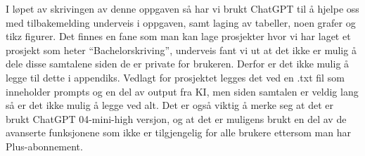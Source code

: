 \documentclass[
  12pt,
  a4paper,
  DIV=11,
  numbers=noendperiod]{scrartcl}
\begin{document}
I løpet av skrivingen av denne oppgaven så har vi brukt ChatGPT til å
hjelpe oss med tilbakemelding underveis i oppgaven, samt laging av
tabeller, noen grafer og tikz figurer. Det finnes en fane som man kan
lage prosjekter hvor vi har laget et prosjekt som heter
``Bachelorskriving'', underveis fant vi ut at det ikke er mulig å dele
disse samtalene siden de er private for brukeren. Derfor er det ikke
mulig å legge til dette i appendiks. Vedlagt for prosjektet legges det
ved en .txt fil som inneholder prompts og en del av output fra KI, men
siden samtalen er veldig lang så er det ikke mulig å legge ved alt. Det
er også viktig å merke seg at det er brukt ChatGPT 04-mini-high versjon,
og at det er muligens brukt en del av de avanserte funksjonene som ikke
er tilgjengelig for alle brukere ettersom man har Plus-abonnement.
\end{document}
